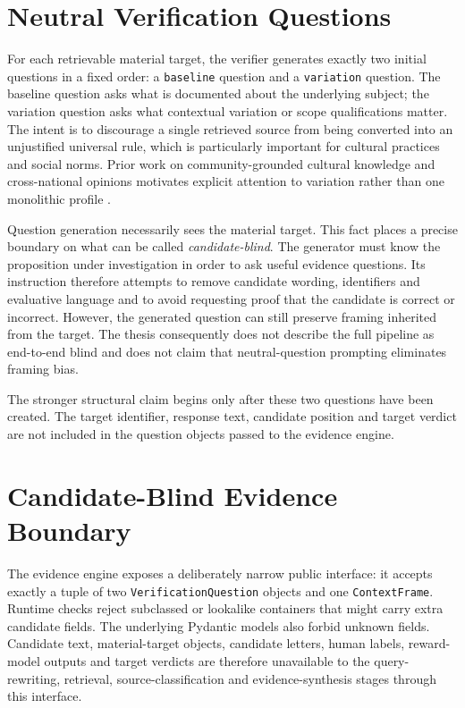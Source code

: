 \section{Neutral Verification Questions}
\label{sec:verification-questions}

For each retrievable material target, the verifier generates exactly two initial questions in a fixed order: a \texttt{baseline} question and a \texttt{variation} question. The baseline question asks what is documented about the underlying subject; the variation question asks what contextual variation or scope qualifications matter. The intent is to discourage a single retrieved source from being converted into an unjustified universal rule, which is particularly important for cultural practices and social norms. Prior work on community-grounded cultural knowledge and cross-national opinions motivates explicit attention to variation rather than one monolithic profile \parencite{shi2024culturebank,durmus2023globalopinionqa}.

Question generation necessarily sees the material target. This fact places a precise boundary on what can be called \emph{candidate-blind}. The generator must know the proposition under investigation in order to ask useful evidence questions. Its instruction therefore attempts to remove candidate wording, identifiers and evaluative language and to avoid requesting proof that the candidate is correct or incorrect. However, the generated question can still preserve framing inherited from the target. The thesis consequently does not describe the full pipeline as end-to-end blind and does not claim that neutral-question prompting eliminates framing bias.

The stronger structural claim begins only after these two questions have been created. The target identifier, response text, candidate position and target verdict are not included in the question objects passed to the evidence engine.

\section{Candidate-Blind Evidence Boundary}
\label{sec:blind-boundary}

The evidence engine exposes a deliberately narrow public interface: it accepts exactly a tuple of two \texttt{VerificationQuestion} objects and one \texttt{ContextFrame}. Runtime checks reject subclassed or lookalike containers that might carry extra candidate fields. The underlying Pydantic models also forbid unknown fields. Candidate text, material-target objects, candidate letters, human labels, reward-model outputs and target verdicts are therefore unavailable to the query-rewriting, retrieval, source-classification and evidence-synthesis stages through this interface.

